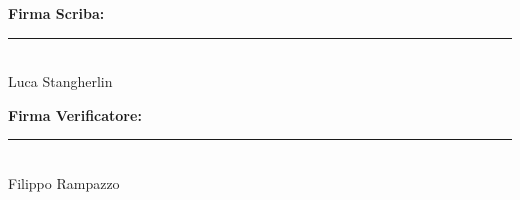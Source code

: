 \documentclass[12pt,a4paper]{article}
\begin{document}
\vspace{35pt}
\noindent
\begin{minipage}[t]{0.45\textwidth}
\textbf{Firma Scriba:}\\[18pt]
\rule{55mm}{0.5pt}\\[2pt]
\small Luca Stangherlin
\end{minipage}
\hfill
\begin{minipage}[t]{0.45\textwidth}
\begin{flushright}
\textbf{Firma Verificatore:}\\[18pt]
\rule{55mm}{0.5pt}\\[2pt]
\small Filippo Rampazzo
\end{flushright}
\end{minipage}
\end{document}
